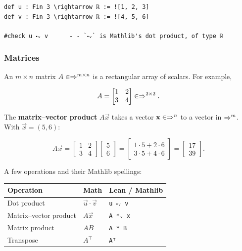 \begin{verbatim}
def u : Fin 3 \rightarrow ℝ := ![1, 2, 3]
def v : Fin 3 \rightarrow ℝ := ![4, 5, 6]

#check u ⬝ᵥ v      - - `⬝ᵥ` is Mathlib's dot product, of type ℝ
\end{verbatim}

\subsubsection{Matrices}

An $m \times n$ matrix $A \in \Rightarrow^{m \times n}$ is a rectangular array of scalars. For example,

\begin{equation}
A = \begin{bmatrix} 1 & 2 \\ 3 & 4 \end{bmatrix} \in \Rightarrow^{2 \times 2}.
\end{equation}

The \textbf{matrix--vector product} $A\vec{x}$ takes a vector $\mathbf{x} \in \Rightarrow^n$ to a vector in
$\Rightarrow^m$. With $\vec{x} = (5, 6)$:

\begin{equation}
A\vec{x}
= \begin{bmatrix} 1 & 2 \\ 3 & 4 \end{bmatrix}\begin{bmatrix} 5 \\ 6 \end{bmatrix}
= \begin{bmatrix} 1\cdot 5 + 2\cdot 6 \\ 3\cdot 5 + 4\cdot 6 \end{bmatrix}
= \begin{bmatrix} 17 \\ 39 \end{bmatrix}.
\end{equation}

A few operations and their Mathlib spellings:

\bigskip\noindent
\begin{tabular}{p{}p{}p{}}
\toprule
Operation & Math & Lean / Mathlib \\
\hline
Dot product & $\vec{u} \cdot \vec{v}$ & \texttt{u ⬝ᵥ v} \\
Matrix--vector product & $A\vec{x}$ & \texttt{A *ᵥ x} \\
Matrix product & $AB$ & \texttt{A * B} \\
Transpose & $A^\top$ & \texttt{Aᵀ} \\
\bottomrule
\end{tabular}

